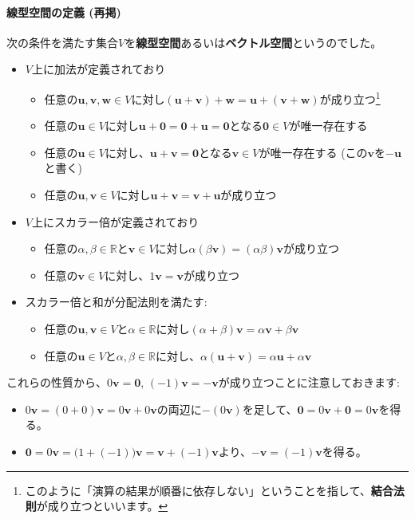 \paragraph{線型空間の定義 (再掲)} \label{def:vector_space}

次の条件を満たす集合$V$を\textbf{線型空間}あるいは\textbf{ベクトル空間}というのでした。

\begin{itemize}
\item $V$上に加法が定義されており
\begin{itemize}
\item 任意の$\bm{u}, \bm{v}, \bm{w}\in V$に対し$(\bm{u} + \bm{v}) + \bm{w} = \bm{u} + (\bm{v} + \bm{w})$が成り立つ\footnote{このように「演算の結果が順番に依存しない」ということを指して、\textbf{結合法則}が成り立つといいます。}
\item 任意の$\bm{u}\in V$に対し$\bm{u} + \bm{0} = \bm{0} + \bm{u} = \bm{0}$となる$\bm{0}\in V$が唯一存在する
\item 任意の$\bm{u}\in V$に対し、$\bm{u} + \bm{v} = \bm{0}$となる$\bm{v}\in V$が唯一存在する (この$\bm{v}$を$-\bm{u}$と書く)
\item 任意の$\bm{u}, \bm{v}\in V$に対し$\bm{u} + \bm{v} = \bm{v} + \bm{u}$が成り立つ
\end{itemize}
\item $V$上にスカラー倍が定義されており
\begin{itemize}
\item 任意の$\alpha, \beta\in\mathbb{R}$と$\bm{v}\in V$に対し$\alpha(\beta\bm{v})=(\alpha\beta)\bm{v}$が成り立つ
\item 任意の$\bm{v}\in V$に対し、$1\bm{v}=\bm{v}$が成り立つ
\end{itemize}
\item スカラー倍と和が分配法則を満たす: 
\begin{itemize}
\item 任意の$\bm{u}, \bm{v}\in V$と$\alpha\in\mathbb{R}$に対し$(\alpha + \beta)\bm{v} = \alpha\bm{v} + \beta\bm{v}$
\item 任意の$\bm{u}\in V$と$\alpha,\beta\in\mathbb{R}$に対し、$\alpha(\bm{u} + \bm{v}) = \alpha\bm{u} + \alpha\bm{v}$
\end{itemize}
\end{itemize}

これらの性質から、$0\bm{v}=\bm{0}$, $(-1)\bm{v} = -\bm{v}$が成り立つことに注意しておきます:
\begin{itemize}
\item $0 \bm{v} = (0 + 0) \bm{v} = 0\bm{v} + 0\bm{v}$の両辺に$-(0\bm{v})$を足して、$\bm{0} = 0\bm{v} + \bm{0} = 0\bm{v}$を得る。
\item $\bm{0} = 0\bm{v} = \bigl(1 + (-1)\bigr)\bm{v} = \bm{v} + (-1) \bm{v}$より、$-\bm{v} = (-1)\bm{v}$を得る。
\end{itemize}

